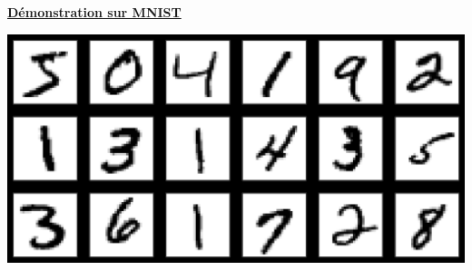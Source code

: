 \documentclass[aspectratio=169, usenames, dvipsnames]{beamer}
\begin{document}
\begin{frame}
  \vfill
  \centering

  \underline{\textbf{Démonstration sur MNIST}}

  \vfill

  \includegraphics[height=.5\textheight]{MNIST}

  \vfill
\end{frame}
\end{document}
